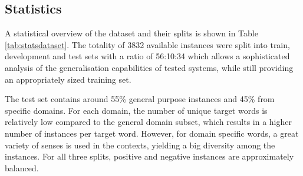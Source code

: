 \documentclass[11pt,a4paper]{article}
\begin{document}
\begin{table}[t]
\setlength{\tabcolsep}{7.0pt}
\caption{\label{tab:statsdataset} Statistics of training, development and testing splits of WiC-TSV, including total number of instances (Total), unique number of target words () and percentage of positive instances ().}
\end{table}


\subsection{Statistics}
\label{statistics}
A statistical overview of the dataset and their splits is shown in Table \ref{tab:statsdataset}. The totality of 3832 available instances were split into train, development and test sets with a ratio of 56:10:34 which allows a sophisticated analysis of the generalisation capabilities of tested systems, while still providing an appropriately sized training set.
 
The test set contains around 55\% general purpose instances and 45\% from specific domains. For each domain, the number of unique target words is relatively low compared to the general domain subset, which results in a higher number of instances per target word. However, for domain specific words, a great variety of senses is used in the contexts, yielding a big diversity among the instances. 
For all three splits, positive and negative instances are approximately balanced.
\end{document}
